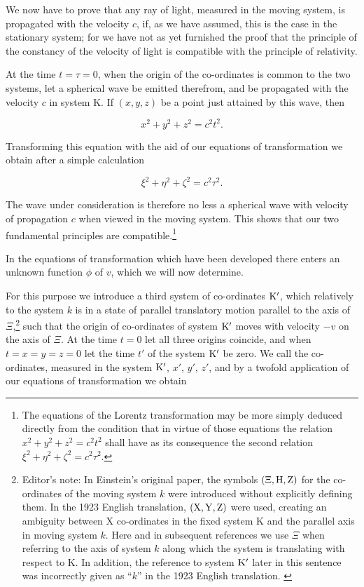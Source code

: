 \documentclass{article}
\newcommand{\pr}[1]{${\rm #1}'$}
\newcounter{fnsave}
\newcommand{\edNoteBegin}{
\renewcommand{\thefootnote}{\fnsymbol{footnote}}
\setcounter{fnsave}{\value{footnote}}
\setcounter{footnote}{1}
}
\newcommand{\edNoteEnd}{
\renewcommand{\thefootnote}{\arabic{footnote}}
\setcounter{footnote}{\value{fnsave}}
}
\begin{document}
We now have to prove that any ray of light, measured in the moving
system, is propagated with the velocity $c$, if, as we have assumed,
this is the case in the stationary system; for we have not as yet
furnished the proof that the principle of the constancy of the
velocity of light is compatible with the principle of relativity.

At the time $t=\tau=0$, when the origin of the co-ordinates is common
to the two systems, let a spherical wave be emitted therefrom, and be
propagated with the velocity $c$ in system K\@.  If $(x, y, z)$ be a point
just attained by this wave, then

\[
x^2+y^2+z^2=c^2t^2.
\]


Transforming this equation with the aid of our equations of
transformation we obtain after a simple calculation

\[
\xi^2+\eta^2+\zeta^2=c^2\tau^2.
\]

The wave under consideration is therefore no less a spherical wave
with velocity of propagation $c$ when viewed in the moving system.  This
shows that our two fundamental principles are
compatible.\footnote{The equations of the Lorentz transformation may be more simply
deduced directly from the condition that in virtue of those equations
the relation
$x^2+y^2+z^2=c^2t^2$
shall have as its consequence the
second relation
$\xi^2+\eta^2+\zeta^2=c^2\tau^2$.}

In the equations of transformation which have been developed there
enters an unknown function $\phi$ of $v$, which we will now determine.

\edNoteBegin
For this purpose we introduce a third system of co-ordinates
\pr{K}, which relatively to the system $k$ is in a state of parallel
translatory motion parallel to the axis of $\Xi$,\footnote{
    {\sf Editor's note:
    In Einstein's original paper, the symbols $(\Xi, {\rm H}, {\rm Z})$ for
    the co-ordinates of the moving system $k$ were introduced
    without explicitly defining them.  In the 1923 English
    translation, $({\rm X}, {\rm Y}, {\rm Z})$ were used, creating an
    ambiguity between {\rm X} co-ordinates in the fixed system
    {\rm K} and the parallel axis in moving system $k$.  Here
    and in subsequent references we use $\Xi$ when referring to
    the axis of system $k$ along which the system is
    translating with respect to {\rm K}\@.  In addition, the
    reference to system \pr{K} later in this sentence was
    incorrectly given as ``$k$'' in the 1923 English
    translation.
    }
}
such that the origin of
co-ordinates of system \pr{K} moves with velocity $-v$ on the axis of $\Xi$.  At
the time $t=0$ let all three origins coincide, and when $t=x=y=z=0$
let the time $t'$ of the system \pr{K} be zero.  We call the
co-ordinates, measured in the system \pr{K}, $x'$, $y'$, $z'$, and by a twofold
application of our equations of transformation we obtain
\edNoteEnd
\end{document}
